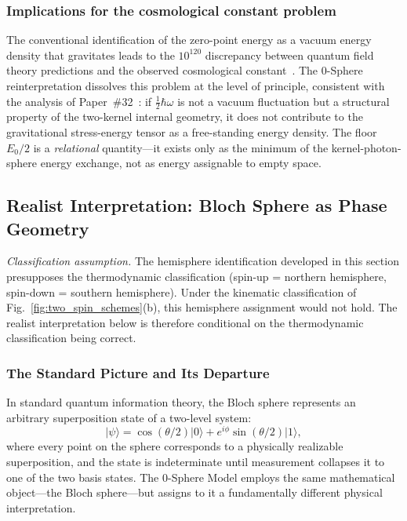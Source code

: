 \documentclass[%
 reprint,
 amsmath,amssymb,
 aps,
 prb,
]{revtex4-2}
\numberwithin{equation}{section}
\theoremstyle{definition}
\theoremstyle{remark}
\begin{document}
\subsubsection{Implications for the cosmological constant problem}

The conventional identification of the zero-point energy as a vacuum energy density that gravitates leads to the $10^{120}$ discrepancy between quantum field theory predictions and the observed cosmological constant~\cite{Weinberg1989}. The 0-Sphere reinterpretation dissolves this problem at the level of principle, consistent with the analysis of Paper~\#32~\cite{Hanamura2026Vacuum}: if $\frac{1}{2}\hbar\omega$ is not a vacuum fluctuation but a structural property of the two-kernel internal geometry, it does not contribute to the gravitational stress-energy tensor as a free-standing energy density. The floor $E_0/2$ is a \emph{relational} quantity---it exists only as the minimum of the kernel-photon-sphere energy exchange, not as energy assignable to empty space.

\subsection{Realist Interpretation: Bloch Sphere as Phase Geometry}
\label{sec:realist_interpretation}

\textit{Classification assumption.} The hemisphere identification developed in this section presupposes the thermodynamic classification (spin-up = northern hemisphere, spin-down = southern hemisphere). Under the kinematic classification of Fig.~\ref{fig:two_spin_schemes}(b), this hemisphere assignment would not hold. The realist interpretation below is therefore conditional on the thermodynamic classification being correct.

\subsubsection{The Standard Picture and Its Departure}

In standard quantum information theory, the Bloch sphere represents an arbitrary superposition state of a two-level system:
\begin{equation}
|\psi\rangle = \cos(\theta/2)|0\rangle + e^{i\phi}\sin(\theta/2)|1\rangle,
\end{equation}
where every point on the sphere corresponds to a physically realizable superposition, and the state is indeterminate until measurement collapses it to one of the two basis states. The 0-Sphere Model employs the same mathematical object---the Bloch sphere---but assigns to it a fundamentally different physical interpretation.
\end{document}
